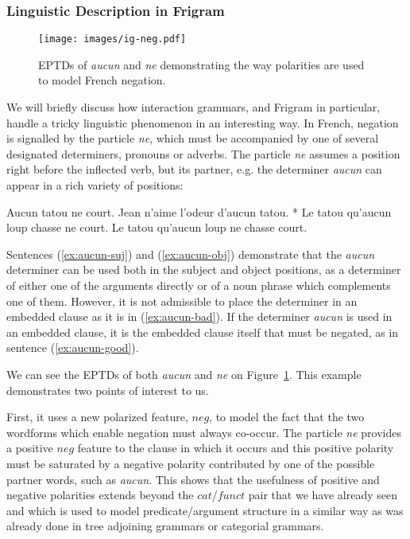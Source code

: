 \subsubsection{Linguistic Description in Frigram}

\begin{figure}
  \centering
  \texttt{[image: images/ig-neg.pdf]}
  \caption{\label{fig:ig-neg} EPTDs of \emph{aucun} and \emph{ne}
    demonstrating the way polarities are used to model French negation.}
\end{figure}

We will briefly discuss how interaction grammars, and Frigram in
particular, handle a tricky linguistic phenomenon in an interesting way.
In French, negation is signalled by the particle \emph{ne}, which must
be accompanied by one of several designated determiners, pronouns or
adverbs. The particle \emph{ne} assumes a position right before the
inflected verb, but its partner, e.g. the determiner \emph{aucun} can
appear in a rich variety of positions:

\begin{exe}
  \ex \label{ex:aucun-suj} Aucun tatou ne court.
  \ex \label{ex:aucun-obj} Jean n'aime l'odeur d'aucun tatou.
  \ex \label{ex:aucun-bad} * Le tatou qu'aucun loup chasse ne court.
  \ex \label{ex:aucun-good} Le tatou qu'aucun loup ne chasse court.
\end{exe}

Sentences (\ref{ex:aucun-suj}) and (\ref{ex:aucun-obj}) demonstrate that
the \emph{aucun} determiner can be used both in the subject and object
positions, as a determiner of either one of the arguments directly or of
a noun phrase which complements one of them. However, it is not
admissible to place the determiner in an embedded clause as it is in
(\ref{ex:aucun-bad}). If the determiner \emph{aucun} is used in an
embedded clause, it is the embedded clause itself that must be negated,
as in sentence (\ref{ex:aucun-good}).

We can see the EPTDs of both \emph{aucun} and \emph{ne} on
Figure~\ref{fig:ig-neg}. This example demonstrates two points of
interest to us.

First, it uses a new polarized feature, $neg$, to model the fact that
the two wordforms which enable negation must always co-occur. The
particle \emph{ne} provides a positive $neg$ feature to the clause in
which it occurs and this positive polarity must be saturated by a
negative polarity contributed by one of the possible partner words, such
as \emph{aucun}. This shows that the usefulness of positive and negative
polarities extends beyond the $cat$/$funct$ pair that we have already
seen and which is used to model predicate/argument structure in a
similar way as was already done in tree adjoining grammars or categorial
grammars.

